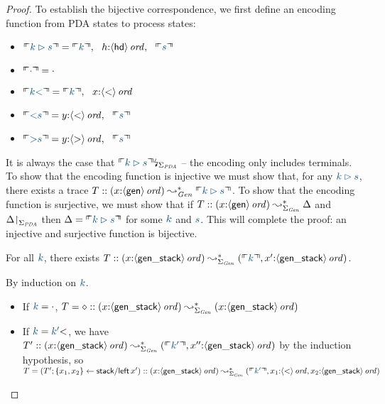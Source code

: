 \begin{proof}To establish the bijective correspondence, we first define
an encoding function from PDA states to process states:
\smallskip
\begin{itemize}
\item $\ctxinterp{k \rhd s} = 
  \ctxinterp{k}, ~~
  h{:}\istrue{\susp{\sf hd}}, ~~
  \ctxinterp{s}$
\item $\ctxinterp{\cdot} = \cdot$
\item $\ctxinterp{k{\sf <}} = \ctxinterp{k}, ~~ x{:}\istrue{\susp{\sf <}}$
\item $\ctxinterp{{\sf <}s} = y{:}\istrue{\susp{\sf <}}, ~~ \ctxinterp{s}$
\item $\ctxinterp{{\sf >}s} = y{:}\istrue{\susp{\sf >}}, ~~ \ctxinterp{s}$
\end{itemize}
\smallskip It is always the case that $\restrictsig{\ctxinterp{k \rhd
    s}}{\Sigma_{\it PDA}}$ -- the encoding only includes terminals.
To show that the encoding function is injective we must show that, for
any $\obj{k \rhd s}$, there exists a trace $T ::
(x{:}\istrue{\susp{\sf gen}}) \leadsto^*_{\it Gen} \ctxinterp{k \rhd
  s}$. To show that the encoding function is surjective, we must show
that if $T :: (x{:}{\langle {\sf gen} \rangle}\,{{\it ord}}) \leadsto^*_{\Sigma_{\it
    Gen}} \Delta$ and ${\Delta}{\upharpoonright}_{\Sigma_{\it PDA}}$ then
$\Delta = \ctxinterp{k \rhd s}$ for some $\obj{k}$ and $\obj{s}$. This
will complete the proof: an injective and surjective function is
bijective.


\begin{lemma} For all $\obj{k}$, there exists
$T :: ({x{:}\istrue{\susp{\sf gen\_stack}}}) \leadsto^*_{\Sigma_{\it Gen}} 
({\ctxinterp{k}, x'{:}\istrue{\susp{\sf gen\_stack}}})$.
\end{lemma}
\noindent
By induction on $\obj{k}$. 
\begin{itemize}
\item If $\obj{k} = \cdot$, $T = \diamond ::
({x{:}{\langle {\sf gen\_stack} \rangle}\,{{\it ord}}}) \leadsto^*_{\Sigma_{\it Gen}} 
(x{:}{\langle {\sf gen\_stack} \rangle}\,{{\it ord}})$
\item If $\obj{k} = \obj{k'}{\sf <}$, we have 
$T' :: ({x{:}\istrue{\susp{\sf gen\_stack}}}) \leadsto^*_{\Sigma_{\it Gen}} 
({\ctxinterp{k'}, x''{:}\istrue{\susp{\sf gen\_stack}}})$ by the induction
hypothesis, so $T = (T'; \trstep{x_1, x_2}{{\sf stack/left}\,x'}) :: 
({x{:}\istrue{\susp{\sf gen\_stack}}}) \leadsto^*_{\Sigma_{\it Gen}} 
({\ctxinterp{k'}, x_1{:}\istrue{\susp{\sf <}}, x_2{:}\istrue{\susp{\sf gen\_stack}}})$
\end{itemize}


\end{proof}
